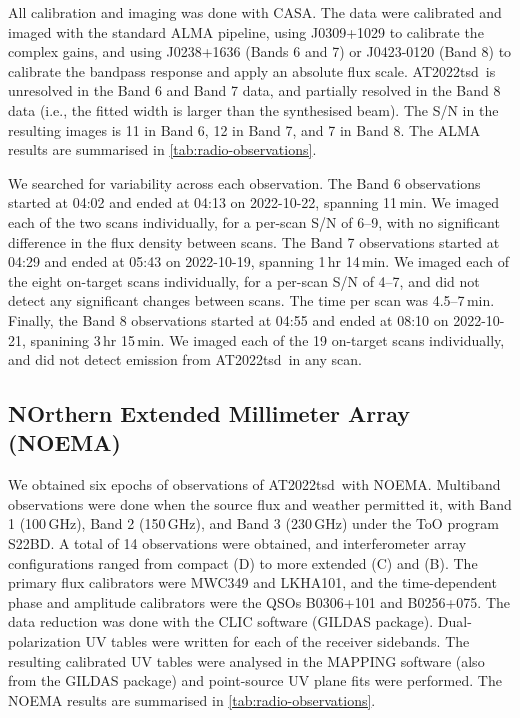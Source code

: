 \documentclass{nature_plusfigure}
\newcommand{\at}{AT2022tsd}
\begin{document}
\begin{methods}

All calibration and imaging was done with CASA.
The data were calibrated and imaged
with the standard ALMA pipeline, using J0309+1029 to calibrate the complex gains, and using J0238+1636 (Bands 6 and 7) or J0423-0120 (Band 8) to calibrate the bandpass response and apply an absolute flux scale.
\at\ is unresolved in the Band 6 and Band 7 data, and partially resolved in the Band 8 data (i.e., the fitted width is larger than the synthesised beam).
The S/N in the resulting images is 11 in Band 6, 12 in Band 7, and 7 in Band 8.
The ALMA results are summarised in \ref{tab:radio-observations}.

We searched for variability across each observation. The Band 6 observations started at 04:02 and ended at 04:13 on 2022-10-22, spanning 11\,min. We imaged each of the two scans individually, for a per-scan S/N of 6--9, with no significant difference in the flux density between scans.
The Band 7 observations started at 04:29 and ended at 05:43 on 2022-10-19, spanning 1\,hr 14\,min.
We imaged each of the eight on-target scans individually, for a per-scan S/N of 4--7, and did not detect any significant changes between scans. The time per scan was 4.5--7\,min.
Finally, the Band 8 observations started at 04:55 and ended at 08:10 on 2022-10-21, spanining 3\,hr 15\,min. We imaged each of the 19 on-target scans individually, and did not detect emission from \at\ in any scan.

\subsection{NOrthern Extended Millimeter Array (NOEMA)}
\label{Methods:NOEMA}

We obtained six epochs of observations of \at\ with NOEMA. Multiband observations were done when the source flux and weather permitted it, with Band 1 (100\,GHz), Band 2 (150\,GHz), and Band 3 (230\,GHz) under the ToO program S22BD. A total of 14 observations were obtained, and interferometer array configurations ranged from compact (D) to more extended (C) and (B). The primary flux calibrators were MWC349 and LKHA101, and the time-dependent phase and amplitude calibrators were the QSOs B0306+101 and B0256+075. The data reduction was done with the CLIC software (GILDAS package\cite{GILDAS}). 
Dual-polarization UV tables were written for each of the receiver sidebands. The resulting calibrated UV tables were analysed in the MAPPING software (also from the GILDAS package) and point-source UV plane fits were performed.
The NOEMA results are summarised in \ref{tab:radio-observations}.


\end{methods}
\end{document}
